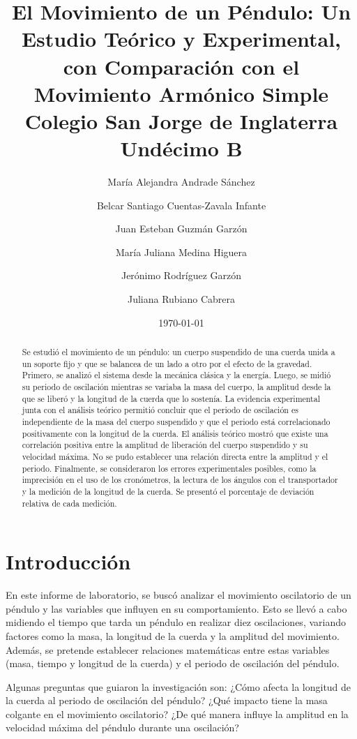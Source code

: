 \documentclass[twocolumn]{article}
\title{
  El Movimiento de un Péndulo: Un Estudio Teórico y Experimental,
  con Comparación con el Movimiento Armónico Simple \\
  {\large Colegio San Jorge de Inglaterra \\
  Undécimo B}
}
\author{
  María Alejandra Andrade Sánchez \and
  Belcar Santiago Cuentas-Zavala Infante \and
  Juan Esteban Guzmán Garzón \and
  María Juliana Medina Higuera \and
  Jerónimo Rodríguez Garzón \and
  Juliana Rubiano Cabrera
}
\date{\today}
\numberwithin{table}{section}
\begin{document}
\maketitle

\newpage
\tableofcontents

\begin{abstract}
  Se estudió el movimiento de un péndulo: un cuerpo suspendido de
  una cuerda unida a un soporte fijo y que se balancea de un lado a
  otro por el efecto de la gravedad. Primero, se analizó el
  sistema desde la mecánica clásica y la energía. Luego, se midió su
  periodo de oscilación mientras se variaba la masa del cuerpo, la
  amplitud desde la que se liberó y la longitud de la cuerda que lo
  sostenía. La evidencia experimental junta con el análisis
  teórico permitió concluir que el periodo de oscilación es
  independiente de la masa del cuerpo suspendido y que el periodo
  está correlacionado positivamente con la longitud de la cuerda.
  El análisis teórico mostró que existe una correlación positiva
  entre la amplitud de liberación del cuerpo suspendido y su
  velocidad máxima. No se pudo establecer una relación directa
  entre la amplitud y el periodo. Finalmente, se consideraron los
  errores experimentales posibles, como la imprecisión en el uso de
  los cronómetros, la lectura de los ángulos con el transportador y
  la medición de la longitud de la cuerda. Se presentó el
  porcentaje de deviación relativa de cada medición.
\end{abstract}

\section{Introducción}

En este informe de laboratorio, se buscó analizar el movimiento
oscilatorio de un péndulo y las variables que influyen en su
comportamiento. Esto se llevó a cabo midiendo el tiempo que tarda un
péndulo en realizar diez oscilaciones, variando factores como la
masa, la longitud de la cuerda y la amplitud del movimiento. Además,
se pretende establecer relaciones matemáticas entre estas variables
(masa, tiempo y longitud de la cuerda) y el periodo de oscilación del
péndulo.

Algunas preguntas que guiaron la investigación son: ¿Cómo
afecta la longitud de la cuerda al periodo de oscilación del péndulo?
¿Qué impacto tiene la masa colgante en el movimiento oscilatorio? ¿De
qué manera influye la amplitud en la velocidad máxima del péndulo
durante una oscilación?
\end{document}
